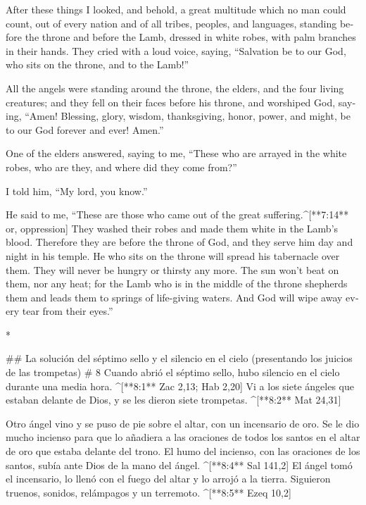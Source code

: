 \begin{paracols}{2}
\begin{english}
 After these things I looked, and behold, a great multitude which no man could count, out of every nation and of all tribes, peoples, and languages, standing before the throne and before the Lamb, dressed in white robes, with palm branches in their hands.  They cried with a loud voice, saying, “Salvation be to our God, who sits on the throne, and to the Lamb!” 

 All the angels were standing around the throne, the elders, and the four living creatures; and they fell on their faces before his throne, and worshiped God,  saying, “Amen! Blessing, glory, wisdom, thanksgiving, honor, power, and might, be to our God forever and ever! Amen.” 

 One of the elders answered, saying to me, “These who are arrayed in the white robes, who are they, and where did they come from?” 

 I told him, “My lord, you know.” 

He said to me, “These are those who came out of the great suffering.^[**7:14** or, oppression] They washed their robes and made them white in the Lamb’s blood.  Therefore they are before the throne of God, and they serve him day and night in his temple. He who sits on the throne will spread his tabernacle over them.  They will never be hungry or thirsty any more. The sun won’t beat on them, nor any heat;  for the Lamb who is in the middle of the throne shepherds them and leads them to springs of life-giving waters. And God will wipe away every tear from their eyes.”

\end{english}
\switchcolumn[0]*

## La solución del séptimo sello y el silencio en el cielo (presentando los juicios de las trompetas)
# 8
 Cuando abrió el séptimo sello, hubo silencio en el cielo durante una media hora. ^[**8:1** Zac 2,13; Hab 2,20]  Vi a los siete ángeles que estaban delante de Dios, y se les dieron siete trompetas. ^[**8:2** Mat 24,31]

 Otro ángel vino y se puso de pie sobre el altar, con un incensario de oro. Se le dio mucho incienso para que lo añadiera a las oraciones de todos los santos en el altar de oro que estaba delante del trono.  El humo del incienso, con las oraciones de los santos, subía ante Dios de la mano del ángel. ^[**8:4** Sal 141,2]  El ángel tomó el incensario, lo llenó con el fuego del altar y lo arrojó a la tierra. Siguieron truenos, sonidos, relámpagos y un terremoto. ^[**8:5** Ezeq 10,2]


\end{paracols}
